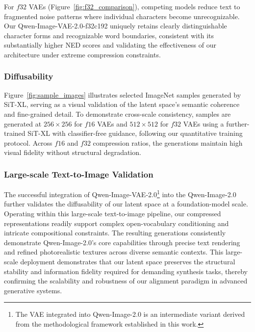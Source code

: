 For $f32$ VAEs (Figure~\ref{fig:f32_comparison}), competing models reduce text to fragmented noise patterns where individual characters become unrecognizable. Our Qwen-Image-VAE-2.0-f32c192 uniquely retains clearly distinguishable character forms and recognizable word boundaries, consistent with its substantially higher NED scores and validating the effectiveness of our architecture under extreme compression constraints.



\subsubsection{Diffusability}
Figure~\ref{fig:sample_images} illustrates selected ImageNet samples generated by SiT-XL, serving as a visual validation of the latent space's semantic coherence and fine-grained detail. To demonstrate cross-scale consistency, samples are generated at $256\times256$ for $f16$ VAEs and $512\times512$ for $f32$ VAEs using a further-trained SiT-XL with classifier-free guidance, following our quantitative training protocol. Across $f16$ and $f32$ compression ratios, the generations maintain high visual fidelity without structural degradation.


\subsubsection{Large-scale Text-to-Image Validation}
The successful integration of Qwen-Image-VAE-2.0\footnote{The VAE integrated into Qwen-Image-2.0 is an intermediate variant derived from the methodological framework established in this work.} into the Qwen-Image-2.0~\citep{qwen-image-2.0} further validates the diffusability of our latent space at a foundation-model scale. Operating within this large-scale text-to-image pipeline, our compressed representations readily support complex open-vocabulary conditioning and intricate compositional constraints. The resulting generations consistently demonstrate Qwen-Image-2.0’s core capabilities through precise text rendering and refined photorealistic textures across diverse semantic contexts. This large-scale deployment demonstrates that our latent space preserves the structural stability and information fidelity required for demanding synthesis tasks, thereby confirming the scalability and robustness of our alignment paradigm in advanced generative systems.

